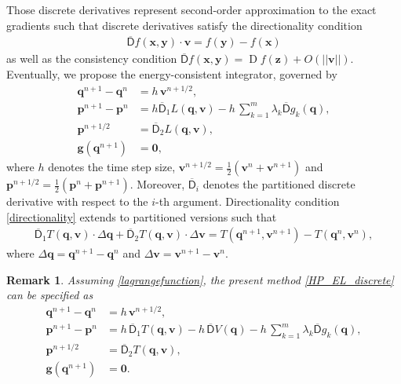 \documentclass{multibody2023_full_paper}
\newtheorem{remark}[theorem]{Remark}
\DeclareMathOperator{\D}{D}
\renewcommand{\vec}[1]{\ensuremath{\mbox{$\mathbf{#1}$}}}
\newcommand{\DG}{\overline{\mathsf{D}}}
\newcommand{\npe}{^{n+1}}
\newcommand{\npeh}{^{n+1/2}}
\newcommand{\n}{^{n}}
\begin{document}
Those discrete derivatives represent second-order approximation to the exact gradients such that discrete derivatives satisfy the directionality condition
\begin{align}
    \DG f(\vec{x},\vec{y}) \cdot \vec{v} = f(\vec{y}) -f (\vec{x}) \label{directionality}
\end{align}
as well as the consistency condition $\DG f(\vec{x},\vec{y}) = \D f(\vec{z}) + O(||\vec{v}||)$. Eventually, we propose the energy-consistent integrator, governed by
\begin{subequations}
    \label{HP_EL_discrete}
    \begin{align}
        \vec{q}\npe - \vec{q}\n & = h \, \vec{v}\npeh \label{HP_EL1_discrete} ,                                                           \\
        \vec{p}\npe - \vec{p}\n & = h \DG_1 L(\vec{q},\vec{v})  \label{HP_EL2_discrete} - h\, \sum_{k=1}^{m} \lambda_k \DG g_k(\vec{q}) , \\
        \vec{p}\npeh            & = \DG_2 L(\vec{q},\vec{v}) \label{HP_EL3_discrete} ,                                                    \\
        \vec{g}(\vec{q}\npe)    & = \vec{0} \label{HP_EL4_discrete} ,
    \end{align}
\end{subequations}
where $h$ denotes the time step size, $\vec{v}\npeh = \frac{1}{2}(\vec{v}\n + \vec{v}\npe)$ and $\vec{p}\npeh = \frac{1}{2}(\vec{p}\n + \vec{p}\npe)$. Moreover, $\DG_i$ denotes the partitioned discrete derivative with respect to the $i$-th argument. Directionality condition \eqref{directionality} extends to partitioned versions such that
\begin{align}
    \DG_1 T(\vec{q},\vec{v}) \cdot \Delta \vec{q} + \DG_2 T(\vec{q},\vec{v}) \cdot \Delta \vec{v} = T(\vec{q}\npe,\vec{v}\npe) - T(\vec{q}\n,\vec{v}\n) ,
\end{align}
where $\Delta \vec{q} = \vec{q}\npe - \vec{q}\n$ and $\Delta \vec{v} = \vec{v}\npe - \vec{v}\n$.

\begin{remark}
    Assuming \eqref{lagrangefunction}, the present method \eqref{HP_EL_discrete} can be specified as
    \begin{subequations}
        \label{HP_EL_discrete_2}
        \begin{align}
            \vec{q}\npe - \vec{q}\n & = h \, \vec{v}\npeh \label{HP_EL1_discrete_2} ,                                                                                    \\
            \vec{p}\npe - \vec{p}\n & = h \, \DG_1 T(\vec{q},\vec{v}) - h \, \DG V(\vec{q}) - h\, \sum_{k=1}^{m} \lambda_k \DG g_k(\vec{q})  \label{HP_EL2_discrete_2} , \\
            \vec{p}\npeh            & = \DG_2 T(\vec{q},\vec{v}) \label{HP_EL3_discrete_2} ,                                                                             \\
            \vec{g}(\vec{q}\npe)    & = \vec{0} .
        \end{align}
    \end{subequations}
\end{remark}
\end{document}
